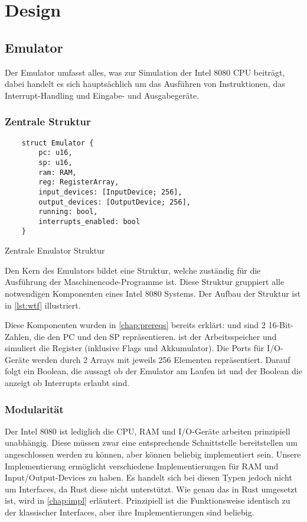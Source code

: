 \chapter{Design}\label{chap:design}

\section{Emulator}

Der Emulator umfasst alles, was zur Simulation der Intel 8080 CPU beiträgt, dabei handelt es sich hauptsächlich um das Ausführen von Instruktionen, das Interrupt-Handling und Eingabe- und Ausgabegeräte.

\subsection{Zentrale Struktur}

\begin{listing}[ht]
\begin{verbatim}
    struct Emulator {
        pc: u16,
        sp: u16,
        ram: RAM,
        reg: RegisterArray,
        input_devices: [InputDevice; 256],
        output_devices: [OutputDevice; 256],
        running: bool,
        interrupts_enabled: bool
    }
\end{verbatim}
\centering
\caption{Zentrale Emulator Struktur}
\label{lst:wtf}
\end{listing}

Den Kern des Emulators bildet eine Struktur, welche zuständig für die Ausführung der Maschinencode-Programme ist. Diese Struktur gruppiert alle notwendigen Komponenten eines Intel 8080 Systems. Der Aufbau der Struktur ist in \cref{lst:wtf} illustriert.

Diese Komponenten wurden in \cref{chap:prereqs} bereits erklärt:  und  sind 2 16-Bit-Zahlen, die den \ac{PC} und den \ac{SP} repräsentieren.  ist der Arbeitsspeicher und  simuliert die Register (inklusive Flags und Akkumulator).
Die Ports für I/O-Geräte werden durch 2 Arrays mit jeweils 256 Elementen repräsentiert.
Darauf folgt ein Boolean, die aussagt ob der Emulator am Laufen ist und der Boolean die anzeigt ob Interrupts erlaubt sind.


\subsection{Modularität}

Der Intel 8080 ist lediglich die CPU, RAM und I/O-Geräte arbeiten prinzipiell unabhängig. Diese müssen zwar eine entsprechende Schnittstelle bereitstellen um angeschlossen werden zu können, aber können beliebig implementiert sein. Unsere Implementierung ermöglicht verschiedene Implementierungen für RAM und Input/Output-Devices zu haben. Es handelt sich bei diesen Typen jedoch nicht um Interfaces, da Rust diese nicht unterstützt. Wie genau das in Rust umgesetzt ist, wird in \cref{chap:impl} erläutert. Prinzipiell ist die Funktionsweise identisch zu der klassischer Interfaces, aber ihre Implementierungen sind beliebig.


